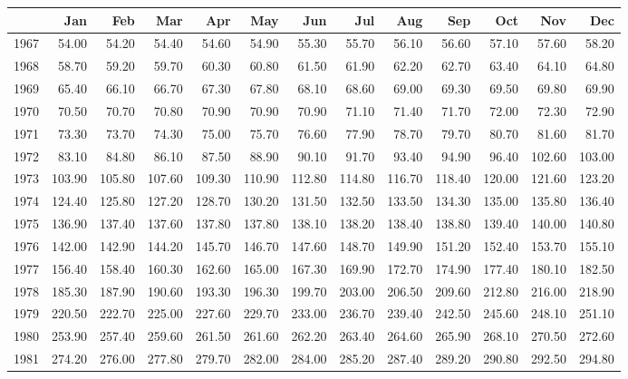 \begin{longtable}{rrrrrrrrrrrrr}
  \hline
 & Jan & Feb & Mar & Apr & May & Jun & Jul & Aug & Sep & Oct & Nov & Dec \\ 
  \hline
1967 & 54.00 & 54.20 & 54.40 & 54.60 & 54.90 & 55.30 & 55.70 & 56.10 & 56.60 & 57.10 & 57.60 & 58.20 \\ 
  1968 & 58.70 & 59.20 & 59.70 & 60.30 & 60.80 & 61.50 & 61.90 & 62.20 & 62.70 & 63.40 & 64.10 & 64.80 \\ 
  1969 & 65.40 & 66.10 & 66.70 & 67.30 & 67.80 & 68.10 & 68.60 & 69.00 & 69.30 & 69.50 & 69.80 & 69.90 \\ 
  1970 & 70.50 & 70.70 & 70.80 & 70.90 & 70.90 & 70.90 & 71.10 & 71.40 & 71.70 & 72.00 & 72.30 & 72.90 \\ 
  1971 & 73.30 & 73.70 & 74.30 & 75.00 & 75.70 & 76.60 & 77.90 & 78.70 & 79.70 & 80.70 & 81.60 & 81.70 \\ 
  1972 & 83.10 & 84.80 & 86.10 & 87.50 & 88.90 & 90.10 & 91.70 & 93.40 & 94.90 & 96.40 & 102.60 & 103.00 \\ 
  1973 & 103.90 & 105.80 & 107.60 & 109.30 & 110.90 & 112.80 & 114.80 & 116.70 & 118.40 & 120.00 & 121.60 & 123.20 \\ 
  1974 & 124.40 & 125.80 & 127.20 & 128.70 & 130.20 & 131.50 & 132.50 & 133.50 & 134.30 & 135.00 & 135.80 & 136.40 \\ 
  1975 & 136.90 & 137.40 & 137.60 & 137.80 & 137.80 & 138.10 & 138.20 & 138.40 & 138.80 & 139.40 & 140.00 & 140.80 \\ 
  1976 & 142.00 & 142.90 & 144.20 & 145.70 & 146.70 & 147.60 & 148.70 & 149.90 & 151.20 & 152.40 & 153.70 & 155.10 \\ 
  1977 & 156.40 & 158.40 & 160.30 & 162.60 & 165.00 & 167.30 & 169.90 & 172.70 & 174.90 & 177.40 & 180.10 & 182.50 \\ 
  1978 & 185.30 & 187.90 & 190.60 & 193.30 & 196.30 & 199.70 & 203.00 & 206.50 & 209.60 & 212.80 & 216.00 & 218.90 \\ 
  1979 & 220.50 & 222.70 & 225.00 & 227.60 & 229.70 & 233.00 & 236.70 & 239.40 & 242.50 & 245.60 & 248.10 & 251.10 \\ 
  1980 & 253.90 & 257.40 & 259.60 & 261.50 & 261.60 & 262.20 & 263.40 & 264.60 & 265.90 & 268.10 & 270.50 & 272.60 \\ 
  1981 & 274.20 & 276.00 & 277.80 & 279.70 & 282.00 & 284.00 & 285.20 & 287.40 & 289.20 & 290.80 & 292.50 & 294.80 \\ 

\end{longtable}
